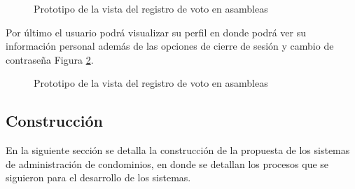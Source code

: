 \begin{figure}[H]
    \centering
    \caption{Prototipo de la vista del registro de voto en asambleas}
    \label{fig:asambleas-votacion-movil}
\end{figure}

Por último el usuario podrá visualizar su perfil en donde podrá ver su información personal además de las opciones de cierre de sesión y cambio de contraseña Figura \ref{fig:perfil-movil}.

\begin{figure}[H]
    \centering
    \caption{Prototipo de la vista del registro de voto en asambleas}
    \label{fig:perfil-movil}
\end{figure}

\subsection{Construcción}\label{subsec:construccion}
En la siguiente sección se detalla la construcción de la propuesta de los sistemas de administración de condominios, en donde se detallan los procesos que se siguieron para el desarrollo de los sistemas.
